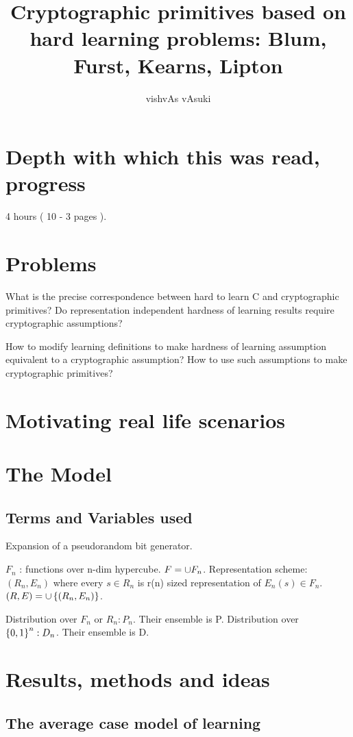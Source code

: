 \documentclass[10pt]{amsart}
\title{Cryptographic primitives based on hard learning problems: Blum, Furst, Kearns, Lipton}
\author{vishvAs vAsuki}
\begin{document}
\maketitle


\section{Depth with which this was read, progress}
4 hours ( 10 - 3 pages ).

\section{Problems}

What is the precise correspondence between hard to learn C and cryptographic primitives? Do representation independent hardness of learning results require cryptographic assumptions?

How to modify learning definitions to make hardness of learning assumption equivalent to a cryptographic assumption? How to use such assumptions to make cryptographic primitives?

\section{Motivating real life scenarios}

\section{The Model}
\subsection{Terms and Variables used}

Expansion of a pseudorandom bit generator.

$F_n$ : functions over n-dim hypercube. $F = \union F_n$. Representation scheme: $(R_n, E_n)$ where every $s \in R_n$ is r(n) sized representation of $E_n(s) \in F_n$. $(R, E) = \union \set{(R_n, E_n)}$.

Distribution over $F_n$ or $R_n: P_n$. Their ensemble is P. Distribution over $\set{0,1}^{n}: D_{n}$. Their ensemble is D.

\section{Results, methods and ideas}

\subsection{The average case model of learning}
\end{document}
